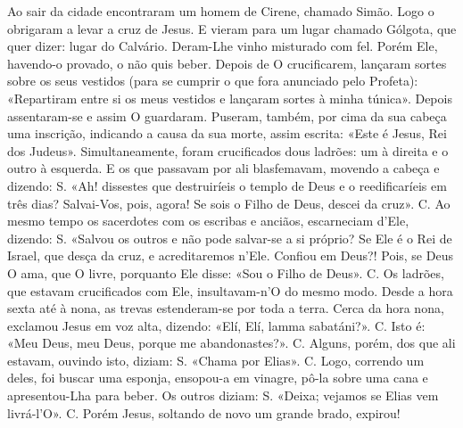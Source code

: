 \begin{paracol}{2}
{Ao sair da cidade encontraram um homem de Cirene, chamado Simão. Logo o obrigaram a levar a cruz de Jesus. E vieram para um lugar chamado Gólgota, que quer dizer: lugar do Calvário. Deram-Lhe vinho misturado com fel. Porém Ele, havendo-o provado, o não quis beber. Depois de O crucificarem, lançaram sortes sobre os seus vestidos (para se cumprir o que fora anunciado pelo Profeta): «Repartiram entre si os meus vestidos e lançaram sortes à minha túnica». Depois assentaram-se e assim O guardaram. Puseram, também, por cima da sua cabeça uma inscrição, indicando a causa da sua morte, assim escrita: «Este é Jesus, Rei dos Judeus». Simultaneamente, foram crucificados dous ladrões: um à direita e o outro à esquerda. E os que passavam por ali blasfemavam, movendo a cabeça e dizendo: {\redx S.} «Ah! dissestes que destruiríeis o templo de Deus e o reedificaríeis em três dias? Salvai-Vos, pois, agora! Se sois o Filho de Deus, descei da cruz». {\redx C.} Ao mesmo tempo os sacerdotes com os escribas e anciãos, escarneciam d’Ele, dizendo: {\redx S.} «Salvou os outros e não pode salvar-se a si próprio? Se Ele é o Rei de Israel, que desça da cruz, e acreditaremos n’Ele. Confiou em Deus?! Pois, se Deus O ama, que O livre, porquanto Ele disse: «Sou o Filho de Deus». {\redx C.} Os ladrões, que estavam crucificados com Ele, insultavam-n’O do mesmo modo. Desde a hora sexta até à nona, as trevas estenderam-se por toda a terra. Cerca da hora nona, exclamou Jesus em voz alta, dizendo: \cruz «Elí, Elí, lamma sabatáni?». {\redx C.} Isto é: \cruz «Meu Deus, meu Deus, porque me abandonastes?». {\redx C.} Alguns, porém, dos que ali estavam, ouvindo isto, diziam: {\redx S.} «Chama por Elias». {\redx C.} Logo, correndo um deles, foi buscar uma esponja, ensopou-a em vinagre, pô-la sobre uma cana e apresentou-Lha para beber. Os outros diziam: {\redx S.} «Deixa; vejamos se Elias vem livrá-l’O». {\redx C.} Porém Jesus, soltando de novo um grande brado, expirou!
}\switchcolumn*{}\switchcolumn{}\switchcolumn*{}
\end{paracol}
